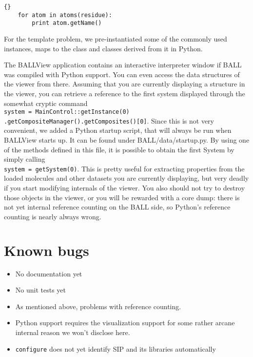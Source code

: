 \begin{lstlisting}{}
	for atom in atoms(residue):
		print atom.getName()
\end{lstlisting}

\noindent For the template problem, we pre-instantiated some of the 
commonly used instances, \eg {} maps to the 
 class and classes derived from it in Python.

The BALLView application contains an interactive interpreter window
if BALL was compiled with Python support. You can even access the
data structures of the viewer from there. Assuming that you are
currently displaying a structure in the viewer, you can retrieve a
reference to the first system displayed through the somewhat cryptic
command 
\\
{\tt system = MainControl::getInstance(0)\\
.getCompositeManager().getComposites()[0]}.
Since this is not very convenient, we added a Python startup script,
that will always be run when BALLView starts up. It can be found
under BALL/data/startup.py. By using one of the methods defined in this file,
it is possible to obtain the first System by simply calling \\
{\tt system = getSystem(0)}.
This is pretty useful for extracting properties from the loaded molecules
and other datasets you are
currently displaying, but very deadly if you start modifying internals
of the viewer. You also should not try to destroy those objects in the
viewer, or you will be rewarded with a core dump: there is not yet
internal reference counting on the BALL side, so Python's reference
counting is nearly always wrong.
		

\section{Known bugs}
\begin{itemize}
	\item No documentation yet
	\item No unit tests yet
	\item As mentioned above, problems with reference counting.
	\item Python support requires the visualization support for some rather
				arcane internal reason we won't disclose here.
	\item {\tt configure} does not yet identify SIP and its libraries
				automatically
\end{itemize}

